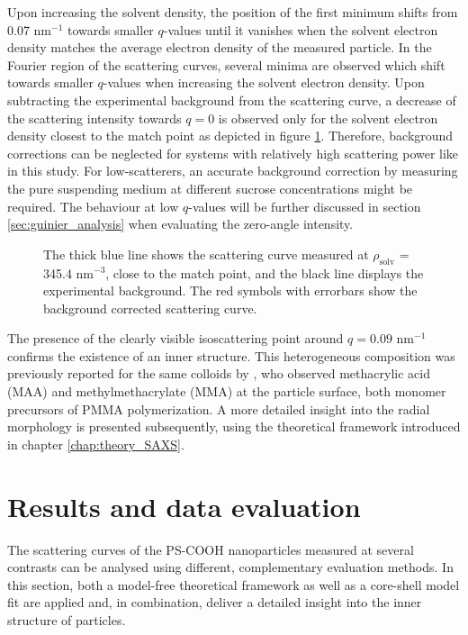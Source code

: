 Upon increasing the solvent density, the position of the first minimum shifts from 0.07 nm\(^{-1}\) towards smaller \(q\)-values until it vanishes when the solvent electron density matches the average electron density of the measured particle. In the Fourier region of the scattering curves, several minima are observed which shift towards smaller \(q\)-values when increasing the solvent electron density. Upon subtracting the experimental background from the scattering curve, a decrease of the scattering intensity towards $q=0$ is observed only for the solvent electron density closest to the match point as depicted in figure \ref{fig:KiskerBackgroundSubtraction}. Therefore, background corrections can be neglected for systems with relatively high scattering power like in this study. For low-scatterers, an accurate background correction by measuring the pure suspending medium at different sucrose concentrations might be required. The behaviour at low $q$-values will be further discussed in section \ref{sec:guinier_analysis} when evaluating the zero-angle intensity.

\begin{figure}%
	\centering
		
		\caption[Background subtraction of the scattering curves of the PS-COOH particles.]{The thick blue line shows the scattering curve measured at $\rho_{\text{solv}}$ = 345.4 nm$^{-3}$, close to the match point, and the black line displays the experimental background. The red symbols with errorbars show the background corrected scattering curve.}
		\label{fig:KiskerBackgroundSubtraction}
\end{figure}

The presence of the clearly visible isoscattering point around \(q=0.09\) nm\(^{-1}\) confirms the existence of an inner structure. This heterogeneous composition was previously reported for the same colloids by \citet{minelli_characterization_2014}, who observed methacrylic acid (MAA) and methylmethacrylate (MMA) at the particle surface, both monomer precursors of PMMA polymerization. A more detailed insight into the radial morphology is presented subsequently, using the theoretical framework introduced in chapter \ref{chap:theory_SAXS}.

\section{Results and data evaluation}
\label{sec:KiskerResultsEvaluation}

The scattering curves of the PS-COOH nanoparticles measured at several contrasts can be analysed using different, complementary evaluation methods. In this section, both a model-free theoretical framework as well as a core-shell model fit are applied and, in combination, deliver a detailed insight into the inner structure of particles.


